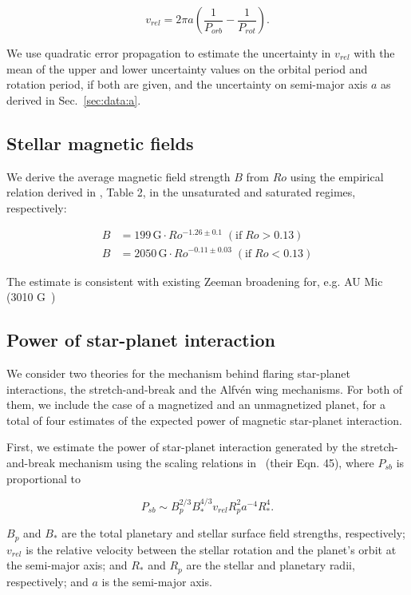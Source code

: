 \documentclass[twocolumn]{aastex631}
\begin{document}
\begin{equation}
    v_{rel} = 2 \pi a \left(\frac{1}{P_{orb}} - \frac{1}{P_{rot}}\right).
\end{equation}

We use quadratic error propagation to estimate the uncertainty in $v_{rel}$ with the mean of the upper and lower uncertainty values on the orbital period and rotation period, if both are given, and the uncertainty on semi-major axis $a$ as derived in Sec.~\ref{sec:data:a}. 

\subsection{Stellar magnetic fields}
\label{sec:methods:bfield}
We derive the average magnetic field strength $B$ from $Ro$ using the empirical relation derived in \cite{reiners2022magnetism},  Table 2, in the unsaturated and saturated regimes, respectively:

\begin{eqnarray}
    B &= 199\,\text{G} \cdot Ro^{-1.26\pm 0.1} \;(\text{if}\; Ro > 0.13) \\
    B &= 2050\,\text{G} \cdot Ro^{-0.11\pm 0.03} \;(\text{if}\; Ro < 0.13) 
\end{eqnarray}

The estimate is consistent with existing Zeeman broadening for, e.g. AU Mic (3010 G~\cite{reiners2022magnetism})
\subsection{Power of star-planet interaction}
\label{sec:methods:pspi}
We consider two theories for the mechanism behind flaring star-planet interactions, the stretch-and-break and the Alfv\'en wing mechanisms. For both of them, we include the case of a magnetized and an unmagnetized planet, for a total of four estimates of the expected power of magnetic star-planet interaction.

First, we estimate the power of star-planet interaction generated by the stretch-and-break mechanism using the scaling relations in~\cite{lanza2012starplanet} (their Eqn. 45), where $P_{sb}$ is proportional to

\begin{equation}
    P_{sb} \sim B_p^{2/3} B_*^{4/3} v_{rel} R_p^2 a^{-4} R_*^4.
\end{equation}

$B_p$ and $B_*$ are the total planetary and stellar surface field strengths, respectively; $v_{rel}$ is the relative velocity between the stellar rotation and the planet's orbit at the semi-major axis; and $R_*$ and $R_p$ are the stellar and planetary radii, respectively; and $a$ is the semi-major axis.
\end{document}
